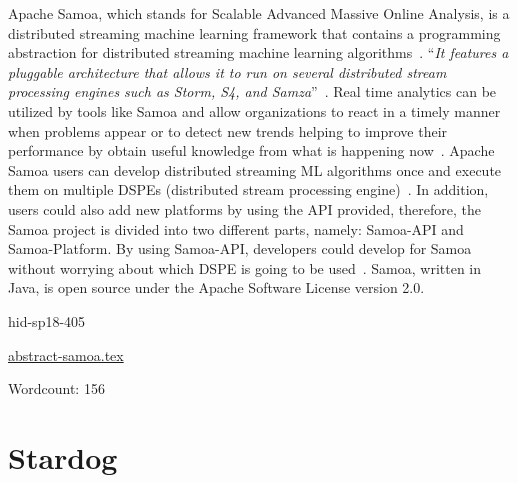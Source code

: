 Apache Samoa, which stands for Scalable Advanced Massive Online
Analysis, is a distributed streaming machine learning framework that
contains a programming abstraction for distributed streaming machine
learning algorithms~\cite{hid-sp18-405-www-samoa}. \color{blue}``\emph{It features a
pluggable architecture that allows it to run on several distributed
stream processing engines such as Storm, S4, and
Samza}''\color{black}~\cite{hid-sp18-405-www-samoa}. Real time analytics can be
utilized by tools like Samoa and allow organizations to react in a
timely manner when problems appear or to detect new trends helping to
improve their performance by obtain useful knowledge from what is
happening now~\cite{hid-sp18-405-bif2015mining-samoa}. Apache Samoa
users can develop distributed streaming ML algorithms once and execute
them on multiple DSPEs (distributed stream processing
engine)~\cite{hid-sp18-405-mor2015samoa-samoa}. In addition, users
could also add new platforms by using the API provided, therefore, the
Samoa project is divided into two different parts, namely: Samoa-API and 
Samoa-Platform. By using Samoa-API, developers could develop for Samoa 
without worrying about which DSPE is going to be 
used~\cite{hid-sp18-405-blog-samoa}. Samoa, written in Java, is open 
source under the Apache Software License version 2.0.



\begin{IU}

hid-sp18-405

\href{https://github.com/cloudmesh-community/hid-sp18-405/blob/master//technology/abstract-samoa.tex}{abstract-samoa.tex}

 

Wordcount: 156

\end{IU}

\section{Stardog}


